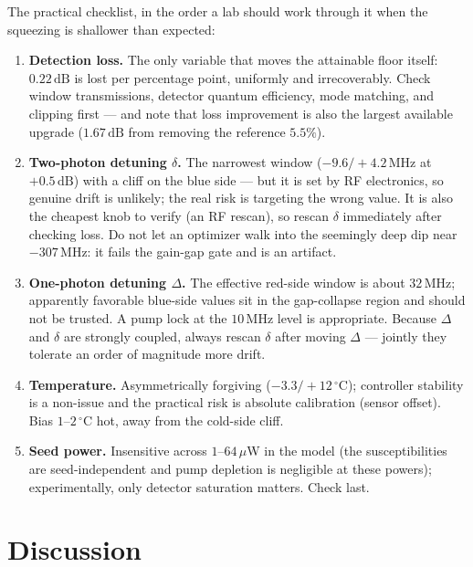\documentclass[11pt,a4paper]{article}
\newcommand{\dB}{\,\mathrm{dB}}
\newcommand{\MHz}{\,\mathrm{MHz}}
\newcommand{\degC}{\,^{\circ}\mathrm{C}}
\begin{document}
The practical checklist, in the order a lab should work through it when the
squeezing is shallower than expected:
\begin{enumerate}[nosep]
\item \textbf{Detection loss.} The only variable that moves the attainable
      floor itself: $0.22\dB$ is lost per percentage point, uniformly and
      irrecoverably. Check window transmissions, detector quantum
      efficiency, mode matching, and clipping first --- and note that loss
      improvement is also the largest available upgrade ($1.67\dB$ from
      removing the reference $5.5\%$).
\item \textbf{Two-photon detuning $\delta$.} The narrowest window
      ($-9.6/{+}4.2\MHz$ at $+0.5\dB$) with a cliff on the blue side ---
      but it is set by RF electronics, so genuine drift is unlikely; the
      real risk is targeting the wrong value. It is also the cheapest knob
      to verify (an RF rescan), so rescan $\delta$ immediately after
      checking loss. Do not let an optimizer walk into the seemingly deep
      dip near $-307\MHz$: it fails the gain-gap gate and is an artifact.
\item \textbf{One-photon detuning $\Delta$.} The effective red-side window
      is about $32\MHz$; apparently favorable blue-side
      values sit in the gap-collapse region and should not be trusted. A
      pump lock at the $10\MHz$ level is appropriate. Because $\Delta$ and
      $\delta$ are strongly coupled, always rescan $\delta$ after moving
      $\Delta$ --- jointly they tolerate an order of magnitude more drift.
\item \textbf{Temperature.} Asymmetrically forgiving
      ($-3.3/{+}12\degC$); controller stability is a non-issue and the
      practical risk is absolute calibration (sensor offset). Bias
      $1$--$2\degC$ hot, away from the cold-side cliff.
\item \textbf{Seed power.} Insensitive across $1$--$64\,\mu$W in the model
      (the susceptibilities are seed-independent and pump depletion is
      negligible at these powers); experimentally, only detector saturation
      matters. Check last.
\end{enumerate}

\section{Discussion}
\label{sec:discussion}
\end{document}
